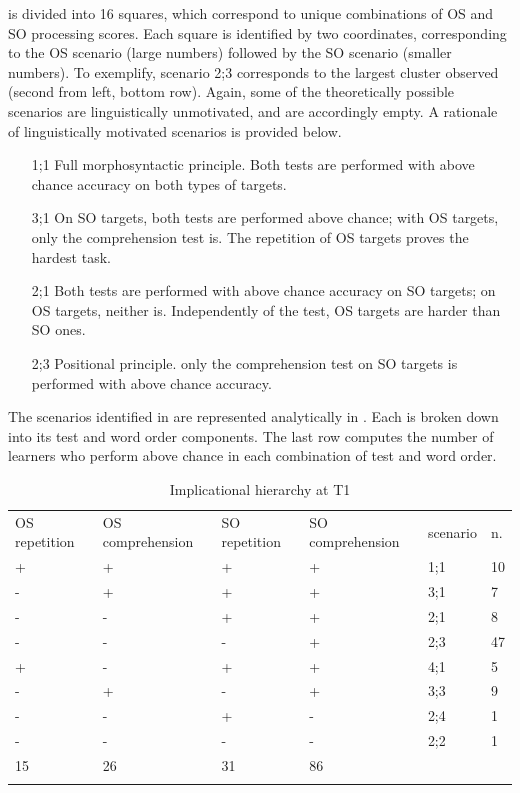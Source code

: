  is divided into 16 squares, which correspond to unique combinations of OS and SO processing scores. Each square is identified by two coordinates, corresponding to the OS scenario (large numbers) followed by the SO scenario (smaller numbers). To exemplify, scenario 2;3 corresponds to the largest cluster observed (second from left, bottom row). Again, some of the theoretically possible scenarios are linguistically unmotivated, and are accordingly empty. A rationale of linguistically motivated scenarios is provided below.

\begin{itemize}
    \item[1;1] Full morphosyntactic principle. Both tests are performed with above chance accuracy on both types of targets.
    \item [3;1] On SO targets, both tests are performed above chance; with OS targets, only the comprehension test is. The repetition of OS targets proves the hardest task.
    \item[2;1] Both tests are performed with above chance accuracy on SO targets; on OS targets, neither is. Independently of the test, OS targets are harder than SO ones.
    \item[2;3] Positional principle. only the comprehension test on SO targets is performed with above chance accuracy. 
\end{itemize}

The scenarios identified in  are represented analytically in . Each is broken down into its test and word order components. The last row computes the number of learners who perform above chance in each combination of test and word order. 

\begin{table}
    \begin{tabularx}{\textwidth}{XXXXXX}
    \lsptoprule
    OS repetition & OS comprehension & SO repetition & SO comprehension & scenario & n. \\
     + & + & + & + & 1;1 & 10\\
     {}- & + & + & + & 3;1 & 7\\
     {}- & {}- & + & + & 2;1 & 8\\
     {}- & {}- & {}- & + & 2;3 & 47\\
     + & {}- & + & + & 4;1 & 5\\
     {}- & + & {}- & + & 3;3 & 9\\
     {}- & {}- & + & {}- & 2;4 & 1\\
     {}- & {}- & {}- & {}- & 2;2 & 1\\
     15 & 26 & 31 & 86 &  & \\
    \lspbottomrule
    \end{tabularx}
    \caption{Implicational hierarchy at T1}
    \label{tab:06:4}
\end{table}

